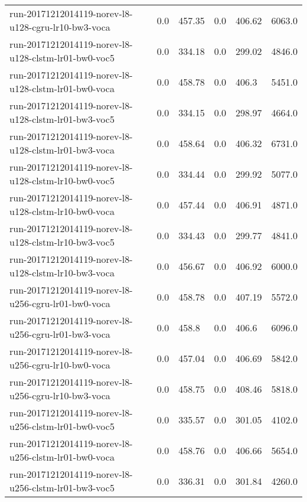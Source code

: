 \begin{landscape}
\begin{longtable}{p{.47\textheight} p{.08\textheight} p{.08\textheight} p{.08\textheight} p{.08\textheight} p{.08\textheight}}
    run-20171212014119-norev-l8-u128-cgru-lr10-bw3-voca & \num{0.0} & \num{457.35} & \num{0.0} & \num{406.62} & \num{6063.0}\\
    run-20171212014119-norev-l8-u128-clstm-lr01-bw0-voc5 & \num{0.0} & \num{334.18} & \num{0.0} & \num{299.02} & \num{4846.0}\\
    run-20171212014119-norev-l8-u128-clstm-lr01-bw0-voca & \num{0.0} & \num{458.78} & \num{0.0} & \num{406.3} & \num{5451.0}\\
    run-20171212014119-norev-l8-u128-clstm-lr01-bw3-voc5 & \num{0.0} & \num{334.15} & \num{0.0} & \num{298.97} & \num{4664.0}\\
    run-20171212014119-norev-l8-u128-clstm-lr01-bw3-voca & \num{0.0} & \num{458.64} & \num{0.0} & \num{406.32} & \num{6731.0}\\
    run-20171212014119-norev-l8-u128-clstm-lr10-bw0-voc5 & \num{0.0} & \num{334.44} & \num{0.0} & \num{299.92} & \num{5077.0}\\
    run-20171212014119-norev-l8-u128-clstm-lr10-bw0-voca & \num{0.0} & \num{457.44} & \num{0.0} & \num{406.91} & \num{4871.0}\\
    run-20171212014119-norev-l8-u128-clstm-lr10-bw3-voc5 & \num{0.0} & \num{334.43} & \num{0.0} & \num{299.77} & \num{4841.0}\\
    run-20171212014119-norev-l8-u128-clstm-lr10-bw3-voca & \num{0.0} & \num{456.67} & \num{0.0} & \num{406.92} & \num{6000.0}\\
    run-20171212014119-norev-l8-u256-cgru-lr01-bw0-voca & \num{0.0} & \num{458.78} & \num{0.0} & \num{407.19} & \num{5572.0}\\
    run-20171212014119-norev-l8-u256-cgru-lr01-bw3-voca & \num{0.0} & \num{458.8} & \num{0.0} & \num{406.6} & \num{6096.0}\\
    run-20171212014119-norev-l8-u256-cgru-lr10-bw0-voca & \num{0.0} & \num{457.04} & \num{0.0} & \num{406.69} & \num{5842.0}\\
    run-20171212014119-norev-l8-u256-cgru-lr10-bw3-voca & \num{0.0} & \num{458.75} & \num{0.0} & \num{408.46} & \num{5818.0}\\
    run-20171212014119-norev-l8-u256-clstm-lr01-bw0-voc5 & \num{0.0} & \num{335.57} & \num{0.0} & \num{301.05} & \num{4102.0}\\
    run-20171212014119-norev-l8-u256-clstm-lr01-bw0-voca & \num{0.0} & \num{458.76} & \num{0.0} & \num{406.66} & \num{5654.0}\\
    run-20171212014119-norev-l8-u256-clstm-lr01-bw3-voc5 & \num{0.0} & \num{336.31} & \num{0.0} & \num{301.84} & \num{4260.0}\\

\end{longtable}
\end{landscape}
